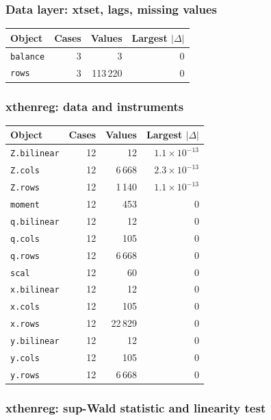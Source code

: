 \subsubsection*{Data layer: xtset, lags, missing values}

\begin{longtable}{@{}p{8.2cm}rrr@{}}
\toprule
Object & Cases & Values & Largest $|\Delta|$ \\
\midrule
\endhead
\texttt{balance} & 3 & 3 & 0 \\
\texttt{rows} & 3 & 113\,220 & 0 \\
\bottomrule
\end{longtable}

\subsubsection*{xthenreg: data and instruments}

\begin{longtable}{@{}p{8.2cm}rrr@{}}
\toprule
Object & Cases & Values & Largest $|\Delta|$ \\
\midrule
\endhead
\texttt{Z.bilinear} & 12 & 12 & $1.1\times10^{-13}$ \\
\texttt{Z.cols} & 12 & 6\,668 & $2.3\times10^{-13}$ \\
\texttt{Z.rows} & 12 & 1\,140 & $1.1\times10^{-13}$ \\
\texttt{moment} & 12 & 453 & 0 \\
\texttt{q.bilinear} & 12 & 12 & 0 \\
\texttt{q.cols} & 12 & 105 & 0 \\
\texttt{q.rows} & 12 & 6\,668 & 0 \\
\texttt{scal} & 12 & 60 & 0 \\
\texttt{x.bilinear} & 12 & 12 & 0 \\
\texttt{x.cols} & 12 & 105 & 0 \\
\texttt{x.rows} & 12 & 22\,829 & 0 \\
\texttt{y.bilinear} & 12 & 12 & 0 \\
\texttt{y.cols} & 12 & 105 & 0 \\
\texttt{y.rows} & 12 & 6\,668 & 0 \\
\bottomrule
\end{longtable}

\subsubsection*{xthenreg: sup-Wald statistic and linearity test}


